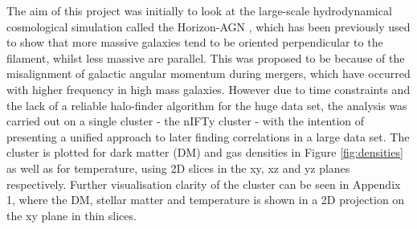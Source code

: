 \documentclass[journal]{IEEEtran}
\begin{document}
The aim of this project was initially to look at the large-scale hydrodynamical cosmological simulation called the Horizon-AGN \cite{dubois14}, which has been previously used to show that more massive galaxies tend to be oriented perpendicular to the filament, whilst less massive are parallel. This was proposed to be because of the misalignment of galactic angular momentum during mergers, which have occurred with higher frequency in high mass galaxies. However due to time constraints and the lack of a reliable halo-finder algorithm for the huge data set, the analysis was carried out on a single cluster - the nIFTy cluster \cite{nifty}- with the intention of presenting a unified approach to later finding correlations in a large data set. The cluster is plotted for dark matter (DM) and gas densities in Figure \ref{fig:densities} as well as for temperature, using 2D slices in the xy, xz and yz planes respectively. Further visualisation clarity of the cluster can be seen in Appendix 1, where the DM, stellar matter and temperature is shown in a 2D projection on the xy plane in thin slices. 
\end{document}
